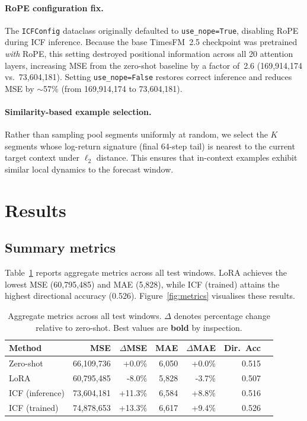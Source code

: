 \documentclass[11pt,a4paper]{article}
\begin{document}
\paragraph{RoPE configuration fix.}
The \texttt{ICFConfig} dataclass originally defaulted to \texttt{use\_nope=True}, disabling RoPE during ICF inference. Because the base TimesFM~2.5 checkpoint was pretrained \emph{with} RoPE, this setting destroyed positional information across all 20 attention layers, increasing MSE from the zero-shot baseline by a factor of~2.6 (169,914,174 vs.\ 73,604,181). Setting \texttt{use\_nope=False} restores correct inference and reduces MSE by $\sim$57\% (from 169,914,174 to 73,604,181).

\paragraph{Similarity-based example selection.}
Rather than sampling pool segments uniformly at random, we select the $K$ segments whose log-return signature (final 64-step tail) is nearest to the current target context under $\ell_2$ distance. This ensures that in-context examples exhibit similar local dynamics to the forecast window.

\section{Results}

\subsection{Summary metrics}

Table~\ref{tab:summary} reports aggregate metrics across all test windows. LoRA achieves the lowest MSE (60,795,485) and MAE (5,828), while ICF (trained) attains the highest directional accuracy (0.526). Figure~\ref{fig:metrics} visualises these results.

\begin{table}[htbp]
\centering
\begin{tabular}{lrrrrrr}\toprule
Method & MSE & $\Delta$MSE & MAE & $\Delta$MAE & Dir.~Acc \\
\midrule
Zero-shot &   66,109,736 & +0.0\% &   6,050 & +0.0\% & 0.515 \\
LoRA &   60,795,485 & -8.0\% &   5,828 & -3.7\% & 0.507 \\
ICF (inference) &   73,604,181 & +11.3\% &   6,584 & +8.8\% & 0.516 \\
ICF (trained) &   74,878,653 & +13.3\% &   6,617 & +9.4\% & 0.526 \\
\bottomrule
\end{tabular}
\caption{Aggregate metrics across all test windows. $\Delta$ denotes percentage change relative to zero-shot. Best values are \textbf{bold} by inspection.}
\label{tab:summary}
\end{table}
\end{document}

